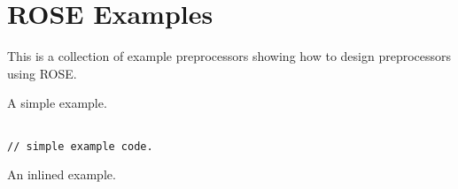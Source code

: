 \chapter{ROSE Examples}

\label{RoseExamples:RoseExamples}

    This is a collection of example preprocessors showing how to
design preprocessors using ROSE.


A simple example.

{\indent
{\mySmallFontSize
\begin{verbatim}

// simple example code.

\end{verbatim}
}
}


An inlined example.


